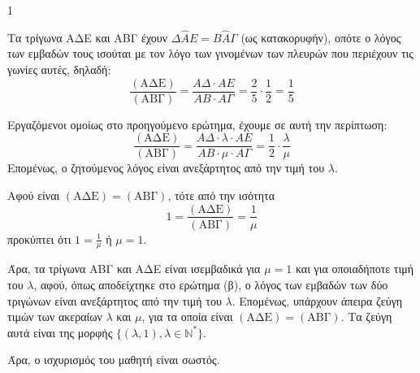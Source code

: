\begin{ylh}{1}
    \item [Τρίγωνα - Εμβαδά]
\end{ylh}
\begin{figure} %
\end{figure}
\begin{alist}
    \item Τα τρίγωνα ΑΔΕ και ΑΒΓ έχουν $\Delta\hat{A}E = B\hat{A}\Gamma$ (ως κατακορυφήν), οπότε ο λόγος των εμβαδών τους ισούται με τον λόγο των γινομένων των πλευρών που περιέχουν τις γωνίες αυτές, δηλαδή:
    \[ \frac{(\text{ΑΔΕ})}{(\text{ΑΒΓ})} = \frac{A\Delta \cdot AE}{AB \cdot A\Gamma} = \frac{2}{5} \cdot \frac{1}{2} = \frac{1}{5} \]
    \item Εργαζόμενοι ομοίως στο προηγούμενο ερώτημα, έχουμε σε αυτή την περίπτωση:
    \[ \frac{(\text{ΑΔΕ})}{(\text{ΑΒΓ})} = \frac{A\Delta \cdot \lambda \cdot AE}{AB \cdot \mu \cdot A\Gamma} = \frac{1}{2} \cdot \frac{\lambda}{\mu} \]
    Επομένως, ο ζητούμενος λόγος είναι ανεξάρτητος από την τιμή του $\lambda$. 
    \item Αφού είναι $(\text{ΑΔΕ}) = (\text{ΑΒΓ})$, τότε από την ισότητα
    \[ 1 = \frac{(\text{ΑΔΕ})}{(\text{ΑΒΓ})} = \frac{1}{\mu} \]
    προκύπτει ότι $1 = \frac{1}{\mu}$ ή $\mu = 1$.

    Άρα, τα τρίγωνα ΑΒΓ και ΑΔΕ είναι ισεμβαδικά για $\mu = 1$ και για οποιαδήποτε τιμή του $\lambda$, αφού, όπως αποδείχτηκε στο ερώτημα (β), ο λόγος των εμβαδών των δύο τριγώνων είναι ανεξάρτητος από την τιμή του $\lambda$. Επομένως, υπάρχουν άπειρα ζεύγη τιμών των ακεραίων $\lambda$ και $\mu$, για τα οποία είναι $(\text{ΑΔΕ}) = (\text{ΑΒΓ})$. Τα ζεύγη αυτά είναι της μορφής $\{(\lambda, 1), \lambda \in \mathbb{N}^* \}$.

    Άρα, ο ισχυρισμός του μαθητή είναι σωστός. 
\end{alist}